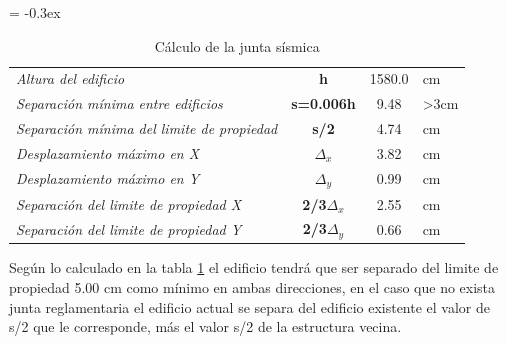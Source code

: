 \documentclass{article}%
\begin{document}
%


\begin{table}[H]%
\centering%
\caption{Cálculo de la junta sísmica}%
\extrarowheight = -0.3ex%
\renewcommand{\arraystretch}{1.5}%
\begin{tabular}{l|c|c|l}%
\cline{2-3}%
\textit{Altura del edificio} & \textbf{h} & {1580.0} & {cm} \\%
\cline{2-3}%
\textit{Separación mínima entre edificios} & \textbf{s=0.006h} & {9.48} & {>3cm} \\%
\cline{2-3}%
\textit{Separación mínima del limite de propiedad} & \textbf{s/2} & {4.74} & {cm} \\%
\cline{2-3}%
\textit{Desplazamiento máximo en X} & \textbf{$\Delta_x$} & {3.82} & {cm} \\%
\cline{2-3}%
\textit{Desplazamiento máximo en Y} & \textbf{$\Delta_y$} & {0.99} & {cm} \\%
\cline{2-3}%
\textit{Separación del limite de propiedad X} & \textbf{2/3$\Delta_{x}$} & {2.55} & {cm} \\%
\cline{2-3}%
\textit{Separación del limite de propiedad Y} & \textbf{2/3$\Delta_{y}$} & {0.66} & {cm} \\%
\cline{2-3}%
\end{tabular}%
\label{tab:junta_sis}%
\end{table}

%
Según lo calculado en la tabla \ref{tab:junta_sis} %
 el edificio tendrá que ser separado del limite de propiedad 5.00 cm como mínimo en ambas direcciones, en el caso que no exista junta reglamentaria el edificio actual se separa del edificio existente el valor de s/2 que le corresponde, más el valor s/2 de la estructura vecina.

%
\end{document}
